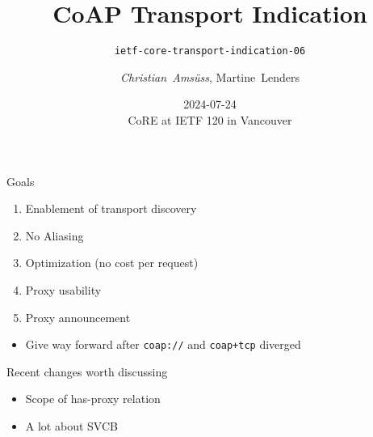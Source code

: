

\title[CoAP Transport Indication]{CoAP Transport Indication}
\subtitle{\texttt{ietf-core-transport-indication-06}}
\author{\textit{Christian~Amsüss}, Martine~Lenders}
\date{2024-07-24 \\CoRE at IETF 120 in Vancouver}



\frame{\titlepage}

\begin{frame}{Goals}\Large
  \begin{enumerate}
    \color{gray} 
    \item Enablement of transport discovery
    \item No Aliasing
    \item Optimization (no cost per request)
    \item Proxy usability
    \item Proxy announcement
  \end{enumerate}

  \bigskip

  \begin{itemize}
    \color{gray} 
    \item Give way forward after \texttt{coap://} and \texttt{coap+tcp} diverged
  \end{itemize}
\end{frame}

\begin{frame}{Recent changes worth discussing}\Large
  \begin{itemize}
    \item Scope of has-proxy relation
    \item A lot about SVCB
  \end{itemize}
\end{frame}

